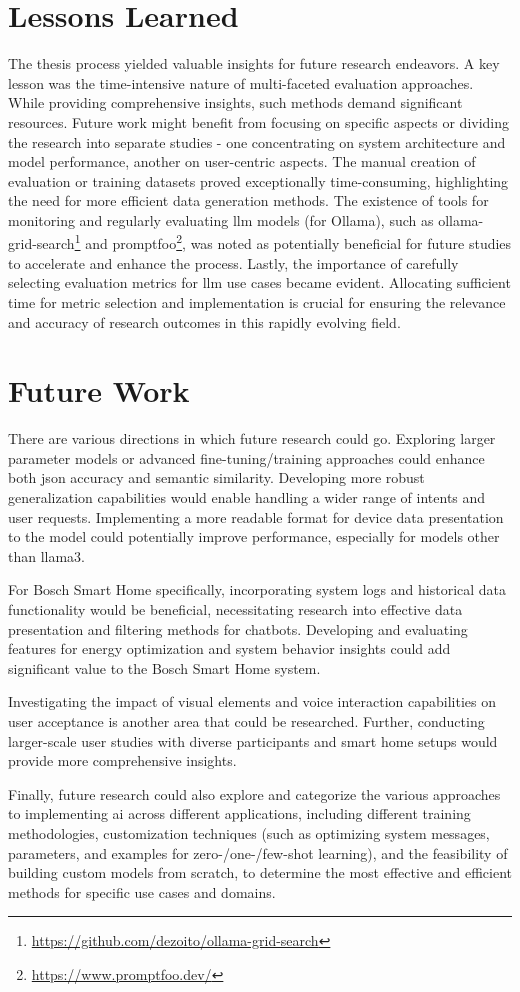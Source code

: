 \section{Lessons Learned}
The thesis process yielded valuable insights for future research endeavors. A key lesson was the time-intensive nature of multi-faceted evaluation approaches. 
While providing comprehensive insights, such methods demand significant resources. 
Future work might benefit from focusing on specific aspects or dividing the research into separate studies - one concentrating on system architecture and model performance, another on user-centric aspects. 
The manual creation of evaluation or training datasets proved exceptionally time-consuming, highlighting the need for more efficient data generation methods. 
The existence of tools for monitoring and regularly evaluating \gls{llm} models (for Ollama), such as ollama-grid-search\footnote{\url{https://github.com/dezoito/ollama-grid-search}} and promptfoo\footnote{\url{https://www.promptfoo.dev/}}, was noted as potentially beneficial for future studies to accelerate and enhance the process. 
Lastly, the importance of carefully selecting evaluation metrics for \gls{llm} use cases became evident. Allocating sufficient time for metric selection and implementation is crucial for ensuring the relevance and accuracy of research outcomes in this rapidly evolving field.

\section{Future Work}
There are various directions in which future research could go.
Exploring larger parameter models or advanced fine-tuning/training approaches could enhance both \gls{json} accuracy and semantic similarity. 
Developing more robust generalization capabilities would enable handling a wider range of intents and user requests.
Implementing a more readable format for device data presentation to the model could potentially improve performance, especially for models other than llama3. 

For Bosch Smart Home specifically, incorporating system logs and historical data functionality would be beneficial, necessitating research into effective data presentation and filtering methods for chatbots.
Developing and evaluating features for energy optimization and system behavior insights could add significant value to the Bosch Smart Home system.

Investigating the impact of visual elements and voice interaction capabilities on user acceptance is another area that could be researched. 
Further, conducting larger-scale user studies with diverse participants and smart home setups would provide more comprehensive insights. 

Finally, future research could also explore and categorize the various approaches to implementing \gls{ai} across different applications, including different training methodologies, customization techniques (such as optimizing system messages, parameters, and examples for zero-/one-/few-shot learning), and the feasibility of building custom models from scratch, to determine the most effective and efficient methods for specific use cases and domains.